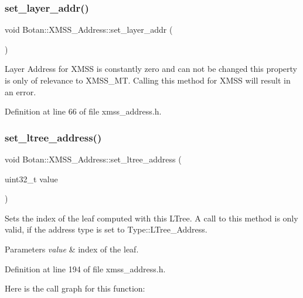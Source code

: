 \subsubsection{\texorpdfstring{set\+\_\+layer\+\_\+addr()}{set\_layer\_addr()}}
{\footnotesize\ttfamily void Botan\+::\+X\+M\+S\+S\+\_\+\+Address\+::set\+\_\+layer\+\_\+addr (\begin{DoxyParamCaption}{ }\end{DoxyParamCaption})\hspace{0.3cm}{\ttfamily [inline]}}

Layer Address for X\+M\+SS is constantly zero and can not be changed this property is only of relevance to X\+M\+S\+S\+\_\+\+MT. Calling this method for X\+M\+SS will result in an error. 

Definition at line 66 of file xmss\+\_\+address.\+h.

\mbox{\label{class_botan_1_1_x_m_s_s___address_af410fcbcc750a12e8650307d51003bc2}} 
\subsubsection{\texorpdfstring{set\+\_\+ltree\+\_\+address()}{set\_ltree\_address()}}
{\footnotesize\ttfamily void Botan\+::\+X\+M\+S\+S\+\_\+\+Address\+::set\+\_\+ltree\+\_\+address (\begin{DoxyParamCaption}\item[{uint32\+\_\+t}]{value }\end{DoxyParamCaption})\hspace{0.3cm}{\ttfamily [inline]}}

Sets the index of the leaf computed with this L\+Tree. A call to this method is only valid, if the address type is set to Type\+::\+L\+Tree\+\_\+\+Address.


\begin{DoxyParams}{Parameters}
{\em value} & index of the leaf. \\
\hline
\end{DoxyParams}


Definition at line 194 of file xmss\+\_\+address.\+h.

Here is the call graph for this function\+:
\mbox{\label{class_botan_1_1_x_m_s_s___address_a2219e289707137fda458eec819933be9}} 
